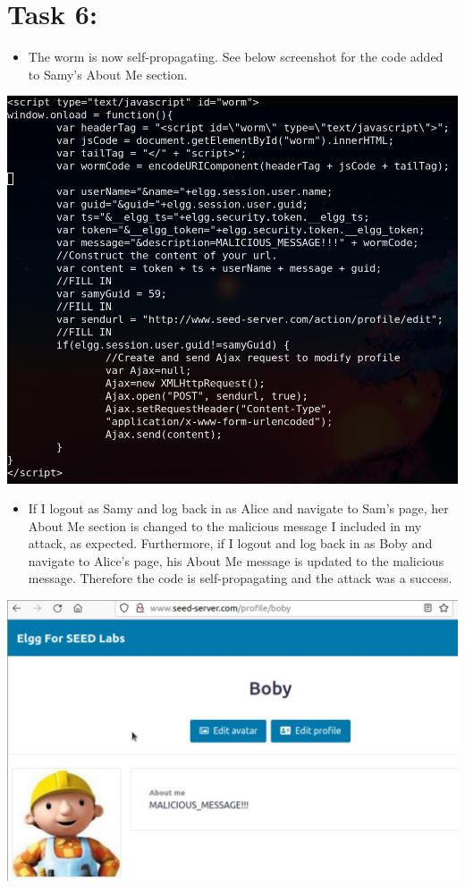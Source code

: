 \documentclass[11pt]{article}
\begin{document}
\section*{Task 6:}
\label{sec:org120176e}
\begin{itemize}
\item The worm is now self-propagating. See below screenshot for the code added to Samy's About Me section.
\end{itemize}
\begin{center}
\includegraphics[width=.9\linewidth]{./images/7.jpg}
\end{center}
\begin{itemize}
\item If I logout as Samy and log back in as Alice and navigate to Sam's page, her About Me section is changed to the malicious message I included in my attack, as expected. Furthermore, if I logout and log back in as Boby and navigate to Alice's page, his About Me message is updated to the malicious message. Therefore the code is self-propagating and the attack was a success.
\end{itemize}
\begin{center}
\includegraphics[width=.9\linewidth]{./images/6.jpg}
\end{center}
\end{document}
